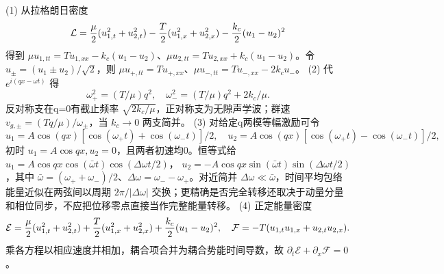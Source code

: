 (1) 从拉格朗日密度
\[
\mathcal L={\mu\over2}(u_{1,t}^2+u_{2,t}^2)-{T\over2}(u_{1,x}^2+u_{2,x}^2)-{k_c\over2}(u_1-u_2)^2
\]
得到 \(\mu u_{1,tt}=T u_{1,xx}-k_c(u_1-u_2)\)、\(\mu u_{2,tt}=T u_{2,xx}+k_c(u_1-u_2)\)。令 \(u_\pm=(u_1\pm u_2)/\sqrt2\)，则
\(\mu u_{+,tt}=Tu_{+,xx}\)、\(\mu u_{-,tt}=Tu_{-,xx}-2k_cu_-\)。
(2) 代 \(e^{i(qx-\omega t)}\) 得
\[
\omega_+^2=(T/\mu)q^2,\quad
\omega_-^2=(T/\mu)q^2+2k_c/\mu.
\]
反对称支在q=0有截止频率 \(\sqrt{2k_c/\mu}\)，正对称支为无隙声学波；群速 \(v_{g,\pm}=(Tq/\mu)/\omega_\pm\)，当 \(k_c\to0\) 两支简并。
(3) 对给定q两模等幅激励可令
\[
u_1=A\cos(qx)[\cos(\omega_+t)+\cos(\omega_-t)]/2,\quad
u_2=A\cos(qx)[\cos(\omega_+t)-\cos(\omega_-t)]/2,
\]
初时 \(u_1=A\cos qx,u_2=0\)，且两者初速均0。恒等式给 \(u_1=A\cos qx\cos(\bar\omega t)\cos(\Delta\omega t/2)\)，
\(u_2=-A\cos qx\sin(\bar\omega t)\sin(\Delta\omega t/2)\)，其中 \(\bar\omega=(\omega_++\omega_-)/2\)、\(\Delta\omega=\omega_--\omega_+\)。对近简并 \(\Delta\omega\ll\bar\omega\)，时间平均包络能量近似在两弦间以周期 \(2\pi/|\Delta\omega|\) 交换；更精确是否完全转移还取决于动量分量和相位同步，不应把位移零点直接当作完整能量转移。
(4) 正定能量密度
\[
\mathcal E={\mu\over2}(u_{1,t}^2+u_{2,t}^2)+{T\over2}(u_{1,x}^2+u_{2,x}^2)+{k_c\over2}(u_1-u_2)^2,
\quad
\mathcal F=-T(u_{1,t}u_{1,x}+u_{2,t}u_{2,x}).
\]
乘各方程以相应速度并相加，耦合项合并为耦合势能时间导数，故 \(\partial_t\mathcal E+\partial_x\mathcal F=0\)。
